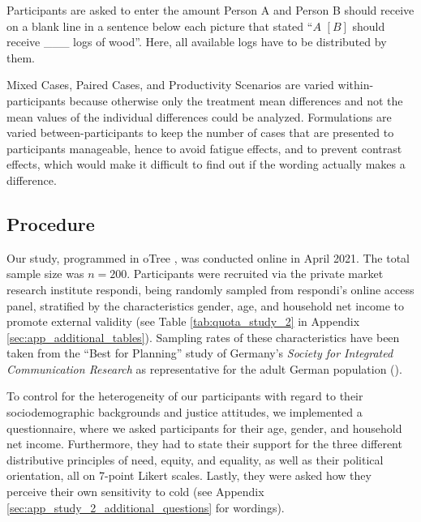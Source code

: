 \documentclass[egregdoesnotlikesansseriftitles]{scrartcl}
\begin{document}
Participants are asked to enter the amount Person A and Person B should receive on a blank line in a sentence below each picture that stated ``$A$ $[B]$ should receive \_\_\_ logs of wood''.
Here, all available logs have to be distributed by them.

Mixed Cases, Paired Cases, and Productivity Scenarios are varied within-participants because otherwise only the treatment mean differences and not the mean values of the individual differences could be analyzed.
Formulations are varied between-participants to keep the number of cases that are presented to participants manageable, hence to avoid fatigue effects, and to prevent contrast effects, which would make it difficult to find out if the wording actually makes a difference.


\subsection{Procedure}
Our study, programmed in oTree \citep{chen_otree_2016}, was conducted online in April 2021.
The total sample size was $n = 200$.
Participants were recruited via the private market research institute respondi, being randomly sampled from respondi's online access panel, stratified by the characteristics gender, age, and household net income to promote external validity (see Table \ref{tab:quota_study_2} in Appendix \ref{sec:app_additional_tables}).
Sampling rates of these characteristics have been taken from the ``Best for Planning'' study of Germany's \textit{Society for Integrated Communication Research} as representative for the adult German population (\citealt[p. 284, 291]{gesellschaft_fur_integrierte_kommunikationsforschung_best_2019}).

To control for the heterogeneity of our participants with regard to their sociodemographic backgrounds and justice attitudes, we implemented a questionnaire, where we asked participants for their age, gender, and household net income.
Furthermore, they had to state their support for the three different distributive principles of need, equity, and equality, as well as their political orientation, all on 7-point Likert scales.
Lastly, they were asked how they perceive their own sensitivity to cold (see Appendix \ref{sec:app_study_2_additional_questions} for wordings).
\end{document}
